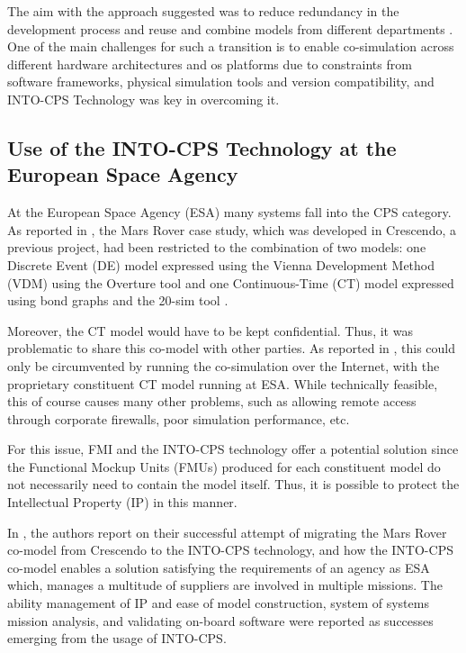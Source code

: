 The aim with the approach suggested was to reduce redundancy in the
development process and reuse and combine models from different
departments \cite{Pedersen&17}. One of the main challenges for such a transition
is to enable co-simulation across different hardware architectures and \ac{os}
platforms due to constraints from software frameworks, physical simulation
tools and version compatibility, and INTO-CPS Technology was key in overcoming
it.

\subsection{Use of the INTO-CPS Technology at the European Space Agency}


At the European Space Agency (ESA) many systems fall into the CPS category.  As
reported in \cite{Feo-Arenis&17}, the Mars Rover case study, which was
developed in Crescendo, a previous project, had been restricted to the
combination of two models:  one Discrete Event (DE) model expressed using the
Vienna Development Method (VDM) \cite{Fitzgerald&08c} using the Overture tool
\cite{Larsen&10a} and one Continuous-Time (CT) model expressed using bond graphs
\cite{Karnopp&68} and the 20-sim tool \cite{Kleijn06}.

Moreover, the CT model would have to be kept confidential.  Thus, it was
problematic to share this co-model with other parties.  As reported in
\cite{Feo-Arenis&17}, this could only be circumvented by running the
co-simulation over the Internet, with the proprietary constituent CT model
running at ESA. While technically feasible, this of course causes many other
problems, such as allowing remote access through corporate firewalls, poor
simulation performance, etc.

For this issue, FMI and the INTO-CPS technology offer a potential solution since
the Functional Mockup Units (FMUs) produced for each constituent model do not
necessarily need to contain the model itself. Thus, it is possible to protect
the Intellectual Property (IP) in this manner.

In \cite{Feo-Arenis&17}, the authors report on their successful attempt of
migrating the Mars Rover co-model from Crescendo to the INTO-CPS technology,
and how the INTO-CPS co-model enables a solution satisfying the requirements of
an agency as ESA which, manages a multitude of suppliers are involved in
multiple  missions. The ability management of IP and ease of model
construction, system of systems mission analysis, and validating on-board
software were reported as successes emerging from the usage of INTO-CPS.


